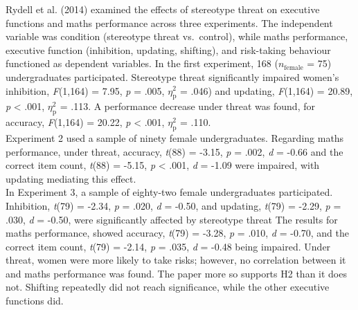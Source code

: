 \documentclass[
  stu, a4paper, 12pt,mask,floatsintext]{apa7}
\begin{document}
Rydell et al. (2014) examined the effects of stereotype threat on executive functions and maths performance across three experiments.
The independent variable was condition (stereotype threat vs.~control), while maths performance, executive function (inhibition, updating, shifting), and risk-taking behaviour functioned as dependent variables.
In the first experiment, 168 (\(n_{\text{female}}\) = 75) undergraduates participated.
Stereotype threat significantly impaired women's inhibition, \emph{F}(1,164) = 7.95, \emph{p} = .005, \(\eta^{2}_{\text{p}}\) = .046) and updating, \emph{F}(1,164) = 20.89, \emph{p} \textless{} .001, \(\eta^{2}_{\text{p}}\) = .113.
A performance decrease under threat was found, for accuracy, \emph{F}(1,164) = 20.22, \emph{p} \textless{} .001, \(\eta^{2}_{\text{p}}\) = .110.\\
Experiment 2 used a sample of ninety female undergraduates.
Regarding maths performance, under threat, accuracy, \emph{t}(88) = -3.15, \emph{p} = .002, \emph{d} = -0.66 and the correct item count, \emph{t}(88) = -5.15, \emph{p} \textless{} .001, \emph{d} = -1.09 were impaired, with updating mediating this effect.\\
In Experiment 3, a sample of eighty-two female undergraduates participated.
Inhibition, \emph{t}(79) = -2.34, \emph{p} = .020, \emph{d} = -0.50, and updating, \emph{t}(79) = -2.29, \emph{p} = .030, \emph{d} = -0.50, were significantly affected by stereotype threat
The results for maths performance, showed accuracy, \emph{t}(79) = -3.28, \emph{p} = .010, \emph{d} = -0.70, and the correct item count, \emph{t}(79) = -2.14, \emph{p} = .035, \emph{d} = -0.48 being impaired.
Under threat, women were more likely to take risks; however, no correlation between it and maths performance was found.
The paper more so supports H2 than it does not. Shifting repeatedly did not reach significance, while the other executive functions did.
\end{document}
